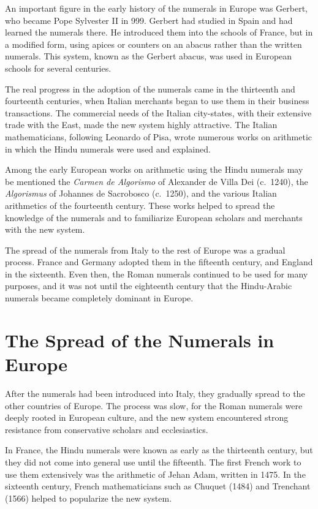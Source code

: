 \documentclass[11pt,a4paper]{article}
\begin{document}
An important figure in the early history of the numerals in Europe was Gerbert, who became Pope Sylvester II in 999. Gerbert had studied in Spain and had learned the numerals there. He introduced them into the schools of France, but in a modified form, using apices or counters on an abacus rather than the written numerals. This system, known as the Gerbert abacus, was used in European schools for several centuries.

The real progress in the adoption of the numerals came in the thirteenth and fourteenth centuries, when Italian merchants began to use them in their business transactions. The commercial needs of the Italian city-states, with their extensive trade with the East, made the new system highly attractive. The Italian mathematicians, following Leonardo of Pisa, wrote numerous works on arithmetic in which the Hindu numerals were used and explained.

Among the early European works on arithmetic using the Hindu numerals may be mentioned the \textit{Carmen de Algorismo} of Alexander de Villa Dei (c.~1240), the \textit{Algorismus} of Johannes de Sacrobosco (c.~1250), and the various Italian arithmetics of the fourteenth century. These works helped to spread the knowledge of the numerals and to familiarize European scholars and merchants with the new system.

The spread of the numerals from Italy to the rest of Europe was a gradual process. France and Germany adopted them in the fifteenth century, and England in the sixteenth. Even then, the Roman numerals continued to be used for many purposes, and it was not until the eighteenth century that the Hindu-Arabic numerals became completely dominant in Europe.


\section{The Spread of the Numerals in Europe}

After the numerals had been introduced into Italy, they gradually spread to the other countries of Europe. The process was slow, for the Roman numerals were deeply rooted in European culture, and the new system encountered strong resistance from conservative scholars and ecclesiastics.

In France, the Hindu numerals were known as early as the thirteenth century, but they did not come into general use until the fifteenth. The first French work to use them extensively was the arithmetic of Jehan Adam, written in 1475. In the sixteenth century, French mathematicians such as Chuquet (1484) and Trenchant (1566) helped to popularize the new system.
\end{document}
